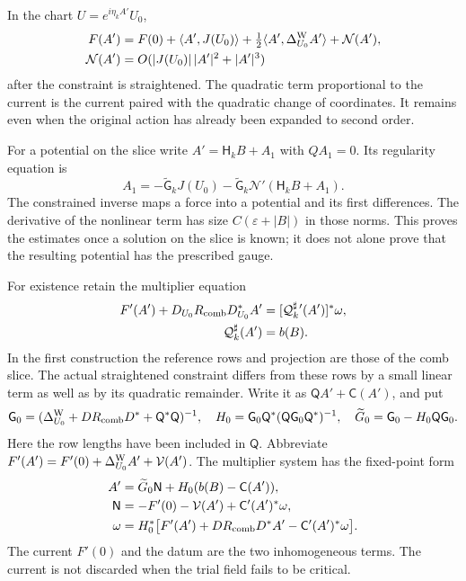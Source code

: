 \documentclass[11pt,letterpaper,reqno]{amsart}
\theoremstyle{definition}
\theoremstyle{remark}
\begin{document}
In the chart $U=e^{i\eta_kA'}U_0$,
\[
 \begin{split}
 F(A')&=F(0)+\langle A',J(U_0)\rangle
       +\tfrac12\langle A',\Delta^{\rm W}_{U_0}A'\rangle
       +\mathcal N(A'),\\
 \mathcal N(A')&=O(|J(U_0)|\,|A'|^2+|A'|^3)
 \end{split}
\]
after the constraint is straightened. The quadratic term
proportional to the current is the current paired with the
quadratic change of coordinates. It remains even when the
original action has already been expanded to second order.

For a potential on the slice write $A'=\mathsf H_kB+A_1$
with $QA_1=0$. Its regularity equation is
\begin{equation}\label{eq:rg-background-equation}
 A_1=-\widetilde{\mathsf G}_kJ(U_0)
       -\widetilde{\mathsf G}_k
                         \mathcal N'(\mathsf H_kB+A_1).
\end{equation}
The constrained inverse maps a force into a potential and
its first differences. The derivative of the nonlinear term
has size $C(\varepsilon+|B|)$ in those norms. This proves
the estimates once a solution on the slice is known; it does
not alone prove that the resulting potential has the
prescribed gauge.

For existence retain the multiplier equation
\begin{equation}\label{eq:xrg-multiplier-system}
 \begin{split}
 F'(A')+D_{U_0}R_{\rm comb}D_{U_0}^*A'
       &=[\mathcal Q_k^\sharp{}'(A')]^*\omega,\\
 \mathcal Q_k^\sharp(A')&=b(B).
 \end{split}
\end{equation}
In the first construction the reference rows and projection
are those of the comb slice. The actual straightened
constraint differs from these rows by a small linear term
as well as by its quadratic remainder. Write it as
$\mathsf Q A'+\mathsf C(A')$, and put
\[
 \mathsf G_0=(\Delta^{\rm W}_{U_0}+DR_{\rm comb}D^*
                                      +\mathsf Q^*\mathsf Q)^{-1},
 \quad
 H_0=\mathsf G_0\mathsf Q^*(\mathsf Q\mathsf G_0\mathsf Q^*)^{-1},
 \quad \widetilde G_0=\mathsf G_0-H_0\mathsf Q\mathsf G_0.
\]
Here the row lengths have been included in $\mathsf Q$.
Abbreviate
$F'(A')=F'(0)+\Delta^{\rm W}_{U_0}A'+\mathcal V(A')$.
The multiplier system has the fixed-point form
\[
 \begin{split}
 A'&=\widetilde G_0\mathsf N
                     +H_0(b(B)-\mathsf C(A')),\\
 \mathsf N&=-F'(0)-\mathcal V(A')+\mathsf C'(A')^*\omega,\\
 \omega&=H_0^*\big[F'(A')+DR_{\rm comb}D^*A'
                                      -\mathsf C'(A')^*\omega\big].
 \end{split}
\]
The current $F'(0)$ and the datum are the two inhomogeneous
terms. The current is not discarded when the trial field
fails to be critical.
\end{document}
